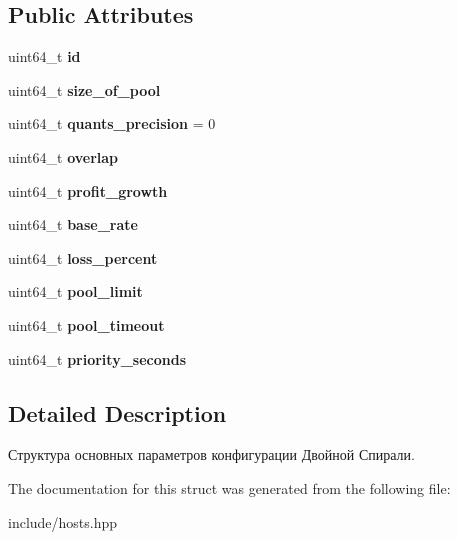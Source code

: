 \subsection*{Public Attributes}
\begin{DoxyCompactItemize}
\item 
\mbox{\label{structspiral_a821f26f81cb47836d12f2d9d6766becc}} 
uint64\+\_\+t {\bfseries id}
\item 
\mbox{\label{structspiral_a7e915995337434e5384c4a77608f16c8}} 
uint64\+\_\+t {\bfseries size\+\_\+of\+\_\+pool}
\item 
\mbox{\label{structspiral_adeb786a290477f8b09bdc20250262729}} 
uint64\+\_\+t {\bfseries quants\+\_\+precision} = 0
\item 
\mbox{\label{structspiral_a89967c6e844fba55fe1b2374a835541f}} 
uint64\+\_\+t {\bfseries overlap}
\item 
\mbox{\label{structspiral_adcd22c1cbd48c166b4634d17cae78075}} 
uint64\+\_\+t {\bfseries profit\+\_\+growth}
\item 
\mbox{\label{structspiral_a79273adc97e3203294c9be82c6302f03}} 
uint64\+\_\+t {\bfseries base\+\_\+rate}
\item 
\mbox{\label{structspiral_aa38a1701402e7f10ad1dac35cd8acef1}} 
uint64\+\_\+t {\bfseries loss\+\_\+percent}
\item 
\mbox{\label{structspiral_a7178955a5b0e1efcb250d6093e7d15da}} 
uint64\+\_\+t {\bfseries pool\+\_\+limit}
\item 
\mbox{\label{structspiral_a112e2db48fc525b87553bb3892d27b74}} 
uint64\+\_\+t {\bfseries pool\+\_\+timeout}
\item 
\mbox{\label{structspiral_a46399788ec0c731594a2b57fa2389a20}} 
uint64\+\_\+t {\bfseries priority\+\_\+seconds}
\end{DoxyCompactItemize}


\subsection{Detailed Description}
Структура основных параметров конфигурации Двойной Спирали. 

The documentation for this struct was generated from the following file\+:\begin{DoxyCompactItemize}
\item 
include/hosts.\+hpp\end{DoxyCompactItemize}
